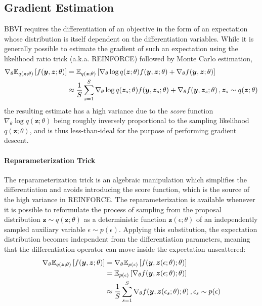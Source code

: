 \documentclass[11pt]{article}
\begin{document}
\subsection{Gradient Estimation}

BBVI requires the differentiation of an objective in the form of an expectation
whose distribution is itself dependent on the differentiation variables.  While
it is generally possible to estimate the gradient of such an expectation using
the likelihood ratio trick (a.k.a. REINFORCE) followed by Monte Carlo
estimation,
%
\begin{align}
  \nabla_\theta {\mathbb{E}}_{q(\bm z;\theta)}\left[ f(\bm y, \bm z; \theta) \right] &=
  {\mathbb{E}}_{q(\bm z;\theta)}\left[ \nabla_\theta \log q(\bm z;\theta) f(\bm y, \bm
  z; \theta) + \nabla_\theta f(\bm y, \bm z; \theta) \right] \nonumber \\
  &\approx \frac{1}{S} \sum_{s=1}^S \nabla_\theta \log q(\bm z_s; \theta) f(\bm
  y, \bm z_s; \theta) + \nabla_\theta f(\bm y, \bm z_s; \theta) \,, \bm z_s
  \sim q(\bm z; \theta)
\end{align}
%
\noindent the resulting estimate has a high variance due to the \emph{score}
function $\nabla_\theta \log q(\bm z; \theta)$ being roughly inversely proportional
to the sampling likelihood $q(\bm z; \theta)$, and is thus less-than-ideal for the
purpose of performing gradient descent.

\paragraph{Reparameterization Trick}

The reparameterization trick is an algebraic manipulation which simplifies the
differentiation and avoids introducing the score function, which is the source
of the high variance in REINFORCE.  The reparameterization is available
whenever it is possible to reformulate the process of sampling from the
proposal distribution $\bm z\sim q(\bm z; \theta)$ as a deterministic function
$\bm z(\epsilon; \theta)$ of an independently sampled auxiliary variable
$\epsilon\sim p(\epsilon)$.  Applying this substitution, the expectation
distribution becomes independent from the differentiation parameters, meaning
that the differentiation operator can move inside the expectation unscattered:
%
\begin{align}
  \nabla_\theta {\mathbb{E}}_{q(\bm z; \theta)}\left[ f(\bm y, \bm z; \theta) \right] &=
  \nabla_\theta {\mathbb{E}}_{p(\epsilon)}\left[ f(\bm y, \bm z(\epsilon; \theta); \theta) \right] \nonumber \\
  &= {\mathbb{E}}_{p(\epsilon)}\left[ \nabla_\theta f(\bm y, \bm z(\epsilon; \theta); \theta) \right] \nonumber \\
  &\approx \frac{1}{S} \sum_{s=1}^S \nabla_\theta f(\bm y, \bm z(\epsilon_s; \theta); \theta)\,, \epsilon_s \sim p(\epsilon)
\end{align}
\end{document}
